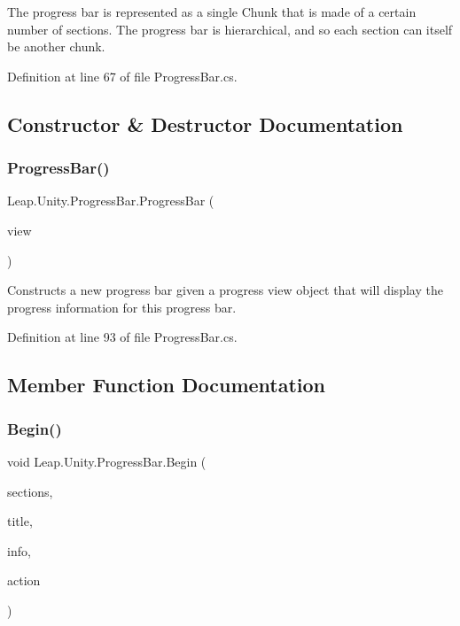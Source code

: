 The progress bar is represented as a single \textquotesingle{}Chunk\textquotesingle{} that is made of a certain number of sections. The progress bar is hierarchical, and so each section can itself be another chunk. 

Definition at line 67 of file Progress\+Bar.\+cs.



\subsection{Constructor \& Destructor Documentation}
\mbox{\label{class_leap_1_1_unity_1_1_progress_bar_a3eae09f6ae1b8ac7ef13c2e5fbb18687}} 
\subsubsection{\texorpdfstring{ProgressBar()}{ProgressBar()}}
{\footnotesize\ttfamily Leap.\+Unity.\+Progress\+Bar.\+Progress\+Bar (\begin{DoxyParamCaption}\item[{\mbox{\hyperlink{interface_leap_1_1_unity_1_1_i_progress_view}{I\+Progress\+View}}}]{view }\end{DoxyParamCaption})}



Constructs a new progress bar given a progress view object that will display the progress information for this progress bar. 



Definition at line 93 of file Progress\+Bar.\+cs.



\subsection{Member Function Documentation}
\mbox{\label{class_leap_1_1_unity_1_1_progress_bar_a82ed530190bcad8fe2d51f1555c50743}} 
\subsubsection{\texorpdfstring{Begin()}{Begin()}}
{\footnotesize\ttfamily void Leap.\+Unity.\+Progress\+Bar.\+Begin (\begin{DoxyParamCaption}\item[{int}]{sections,  }\item[{string}]{title,  }\item[{string}]{info,  }\item[{Action}]{action }\end{DoxyParamCaption})}



